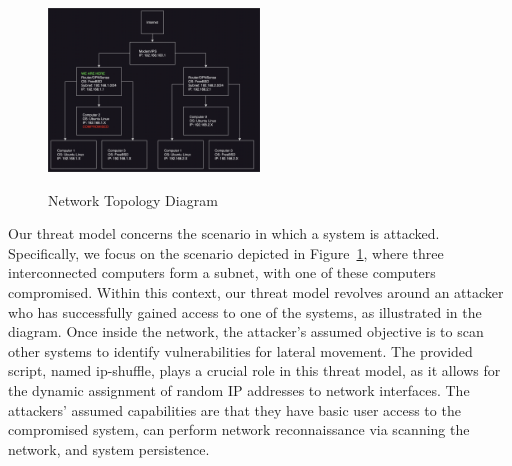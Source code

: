 \begin{figure}
 \caption{Network Topology Diagram}
  \centering
   \includegraphics[width=0.5\textwidth]{diagram.png}
   \label{fig:network-topology}
\end{figure}


Our threat model concerns the scenario in which a system is attacked. Specifically, we focus on the scenario depicted in Figure~\ref{fig:network-topology}, where three interconnected computers form a subnet, with one of these computers compromised. Within this context, our threat model revolves around an attacker who has successfully gained access to one of the systems, as illustrated in the diagram. Once inside the network, the attacker's assumed objective is to scan other systems to identify vulnerabilities for lateral movement. The provided script, named ip-shuffle, plays a crucial role in this threat model, as it allows for the dynamic assignment of random IP addresses to network interfaces. The attackers' assumed capabilities are that they have basic user access to the compromised system, can perform network reconnaissance via scanning the network, and system persistence. 
